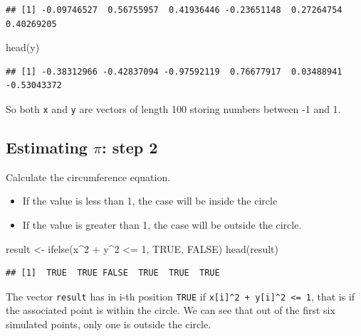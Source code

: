 \documentclass[
]{book}
\newenvironment{Shaded}{\begin{snugshade}}{\end{snugshade}}
\newcommand{\ConstantTok}[1]{\textcolor[rgb]{0.00,0.00,0.00}{#1}}
\newcommand{\DecValTok}[1]{\textcolor[rgb]{0.00,0.00,0.81}{#1}}
\newcommand{\FunctionTok}[1]{\textcolor[rgb]{0.00,0.00,0.00}{#1}}
\newcommand{\NormalTok}[1]{#1}
\newcommand{\OtherTok}[1]{\textcolor[rgb]{0.56,0.35,0.01}{#1}}
\newcommand{\SpecialCharTok}[1]{\textcolor[rgb]{0.00,0.00,0.00}{#1}}
\providecommand{\tightlist}{%
  \setlength{\itemsep}{0pt}\setlength{\parskip}{0pt}}
\theoremstyle{definition}
\theoremstyle{definition}
\theoremstyle{definition}
\theoremstyle{definition}
\theoremstyle{remark}
\begin{document}
\begin{verbatim}
## [1] -0.09746527  0.56755957  0.41936446 -0.23651148  0.27264754  0.40269205
\end{verbatim}

\begin{Shaded}
\begin{Highlighting}[]
\FunctionTok{head}\NormalTok{(y)}
\end{Highlighting}
\end{Shaded}

\begin{verbatim}
## [1] -0.38312966 -0.42837094 -0.97592119  0.76677917  0.03488941 -0.53043372
\end{verbatim}

So both \texttt{x} and \texttt{y} are vectors of length 100 storing numbers between -1 and 1.

\hypertarget{estimating-pi-step-2}{%
\subsection{\texorpdfstring{Estimating \(\pi\): step 2}{Estimating \textbackslash pi: step 2}}\label{estimating-pi-step-2}}

Calculate the circumference equation.

\begin{itemize}
\tightlist
\item
  If the value is less than 1, the case will be inside the circle
\item
  If the value is greater than 1, the case will be outside the circle.
\end{itemize}

\begin{Shaded}
\begin{Highlighting}[]
\NormalTok{result }\OtherTok{\textless{}{-}} \FunctionTok{ifelse}\NormalTok{(x}\SpecialCharTok{\^{}}\DecValTok{2} \SpecialCharTok{+}\NormalTok{ y}\SpecialCharTok{\^{}}\DecValTok{2} \SpecialCharTok{\textless{}=} \DecValTok{1}\NormalTok{, }\ConstantTok{TRUE}\NormalTok{, }\ConstantTok{FALSE}\NormalTok{)}
\FunctionTok{head}\NormalTok{(result)}
\end{Highlighting}
\end{Shaded}

\begin{verbatim}
## [1]  TRUE  TRUE FALSE  TRUE  TRUE  TRUE
\end{verbatim}

The vector \texttt{result} has in i-th position \texttt{TRUE} if \texttt{x{[}i{]}\^{}2\ +\ y{[}i{]}\^{}2\ \textless{}=\ 1}, that is if the associated point is within the circle. We can see that out of the first six simulated points, only one is outside the circle.
\end{document}
